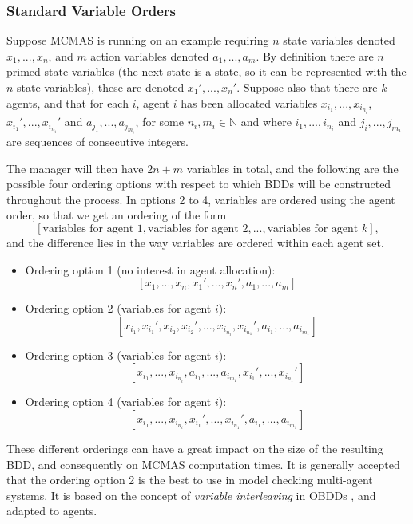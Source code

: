 \documentclass[11pt]{article}
\begin{document}
\subsubsection{Standard Variable Orders}
 \label{std_orderings}
Suppose MCMAS is running on an example requiring $n$ state variables denoted $x_1, ..., x_n$, and $m$ action variables denoted $a_1, ..., a_m$. By definition there are $n$ primed state variables (the next state is a state, so it can be represented with the $n$ state variables), these are denoted $x_1', ..., x_n'$. 
Suppose also that there are $k$ agents, and that for each $i$, agent $i$ has been allocated variables $x_{i_1}, ..., x_{i_{n_i}}$, $x_{i_1}', ..., x_{i_{n_i}}'$ and $a_{j_1}, ..., a_{j_{m_i}}$, for some $n_i, m_i \in \mathbb{N}$ and where $i_1, ..., i_{n_i}$ and $j_i, ..., j_{m_i}$ are sequences of consecutive integers.



The manager will then have $2n + m$ variables in total, and the following are the possible four ordering options with respect to which BDDs will be constructed throughout the process.
In options 2 to 4, variables are ordered using the agent order, so that we get an ordering of the form $$ [\mbox{variables for agent } 1, \mbox{variables for agent } 2, ...,  \mbox{variables for agent } k],$$ 
and the difference lies in the way variables are ordered within each agent set.
\begin{itemize}
\item Ordering option 1 (no interest in agent allocation):
$$[x_1, ..., x_n, x_1', ..., x_n', a_1, ..., a_m]$$
\item Ordering option 2 (variables for agent $i$):
$$
 [x_{i_1}, x_{i_1}', x_{i_2}, x_{i_2}',..., x_{i_{n_i}}, x_{i_{n_1}}', a_{i_1}, ..., a_{i_{m_1}}]
$$
\item Ordering option 3 (variables for agent $i$):
$$
 [x_{i_1}, ..., x_{i_{n_i}},a_{i_1}, ..., a_{i_{m_1}}, x_{i_1}', ..., x_{i_{n_1}}']
$$
\item Ordering option 4 (variables for agent $i$):
$$
 [x_{i_1}, ..., x_{i_{n_i}}, x_{i_1}', ..., x_{i_{n_1}}', a_{i_1}, ..., a_{i_{m_1}}]
$$
\end{itemize}

These different orderings can have a great impact on the size of the resulting BDD, and consequently on MCMAS computation times. It is generally accepted that the ordering option 2 is the best to use in model checking multi-agent systems. It is based on the concept of \textit{variable interleaving} in OBDDs \cite{interleaving}, and adapted to agents.
\end{document}
